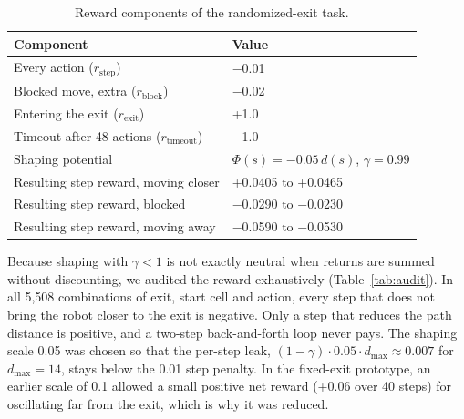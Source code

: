 \documentclass[conference]{IEEEtran}
\begin{document}
\begin{table}[!t]
\caption{Reward components of the randomized-exit task.}
\label{tab:reward}
\centering\footnotesize\renewcommand{\arraystretch}{1.12}
\begin{tabular}{@{}>{\raggedright\arraybackslash}p{3.5cm}>{\raggedright\arraybackslash}p{3.7cm}@{}}
\toprule
Component & Value \\ \midrule
Every action ($r_{\text{step}}$) & $-$0.01 \\
Blocked move, extra ($r_{\text{block}}$) & $-$0.02 \\
Entering the exit ($r_{\text{exit}}$) & +1.0 \\
Timeout after 48 actions ($r_{\text{timeout}}$) & $-$1.0 \\
Shaping potential & $\Phi(s) = -0.05\,d(s)$, $\gamma = 0.99$ \\
Resulting step reward, moving closer & +0.0405 to +0.0465 \\
Resulting step reward, blocked & $-$0.0290 to $-$0.0230 \\
Resulting step reward, moving away & $-$0.0590 to $-$0.0530 \\
\bottomrule
\end{tabular}
\end{table}

Because shaping with $\gamma < 1$ is not exactly neutral when returns are summed without discounting, we audited the reward exhaustively (Table~\ref{tab:audit}). In all 5,508 combinations of exit, start cell and action, every step that does not bring the robot closer to the exit is negative. Only a step that reduces the path distance is positive, and a two-step back-and-forth loop never pays. The shaping scale 0.05 was chosen so that the per-step leak, $(1-\gamma)\cdot 0.05 \cdot d_{\max} \approx 0.007$ for $d_{\max} = 14$, stays below the 0.01 step penalty. In the fixed-exit prototype, an earlier scale of 0.1 allowed a small positive net reward (+0.06 over 40 steps) for oscillating far from the exit, which is why it was reduced.
\end{document}
